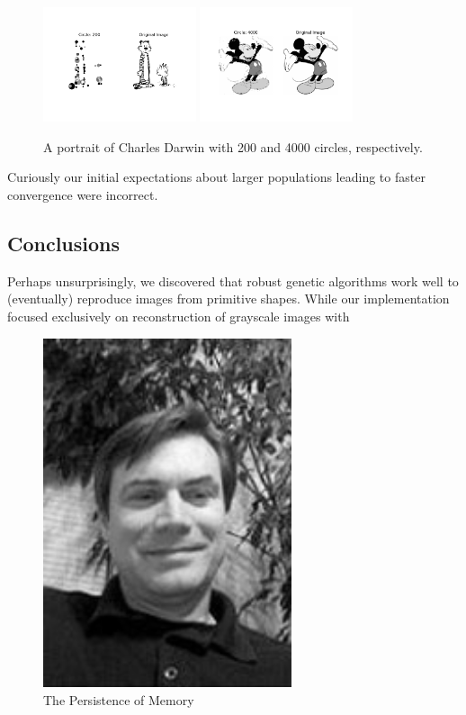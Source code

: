 \documentclass[12pt]{article}
\begin{document}
\begin{figure}[H]
\centering
\noindent\includegraphics[width=0.4\textwidth]{../results/cartoons/hobbes_0200}
\noindent\includegraphics[width=0.4\textwidth]{../results/mickey/mickey_4000}
\caption{A portrait of Charles Darwin with 200 and 4000 circles, respectively. }
\label{fig:hobbes_0200}
\end{figure}
Curiously our initial expectations about larger populations leading to faster convergence were incorrect. 


\subsection{Conclusions}
Perhaps unsurprisingly, we discovered that robust genetic algorithms work well to (eventually) reproduce images from primitive shapes. While our implementation focused exclusively on reconstruction of grayscale images with 

\begin{figure}[H]
\centering
\noindent\includegraphics[width=0.65\textwidth]{../images/jmcgough}
\caption{The Persistence of Memory}
\label{fig:jmcgough}
\end{figure}
\end{document}
